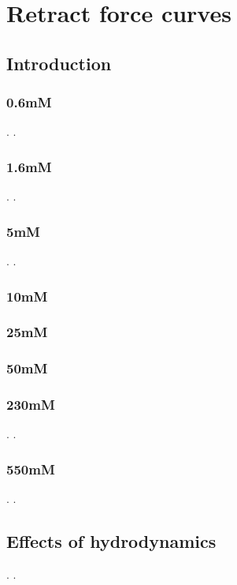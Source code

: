 \chapter{Retract force curves}

\section{Introduction}

\newpage

\subsection{0.6mM}
.
\newpage.
\newpage

\subsection{1.6mM}
.
\newpage.
\newpage

\subsection{5mM}
.
\newpage.
\newpage

\subsection{10mM}

\newpage

\subsection{25mM}

\newpage

\subsection{50mM}

\newpage

\subsection{230mM}
.
\newpage.
\newpage

\subsection{550mM}
.
\newpage.
\newpage

\section{Effects of hydrodynamics}
.
\newpage.
\newpage

